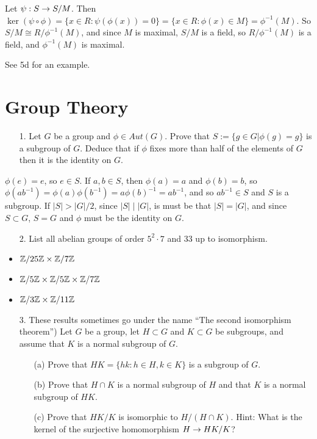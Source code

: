 \documentclass{hmwk}
\begin{document}
\pre Let $\psi: S \rightarrow S/M$. Then $\ker(\psi\circ\phi) = \{x \in R : \psi(\phi(x)) = 0\} = \{x \in R : \phi(x) \in M\} = \phi^{-1}(M)$. So $S/M \cong R/\phi^{-1}(M)$, and since $M$ is maximal, $S/M$ is a field, so $R/\phi^{-1}(M)$ is a field, and $\phi^{-1}(M)$ is maximal. 

\pre See 5d for an example. 

\section{Group Theory}

\begin{itemize}
    \item[1.] Let $G$ be a group and $\phi \in Aut(G)$. Prove that $S := \{g \in G | \phi(g) = g\}$ is a subgroup of $G$. Deduce that if $\phi$ fixes more than half of the elements of $G$ then it is the identity on $G$.
\end{itemize}

\pre $\phi(e) = e$, so $e \in S$. If $a, b \in S$, then $\phi(a) = a$ and $\phi(b) = b$, so $\phi(ab^{-1}) = \phi(a)\phi(b^{-1}) = a\phi(b)^{-1} = ab^{-1}$, and so $ab^{-1} \in S$ and $S$ is a subgroup. If $|S| > |G|/2$, since $|S| \mid |G|$, is must be that $|S| = |G|$, and since $S \subset G$, $S = G$ and $\phi$ must be the identity on $G$. 

\begin{itemize}
    \item[2.] List all abelian groups of order $5^2 \cdot 7$ and $33$ up to isomorphism. 
\end{itemize}

\begin{itemize}
    \item $\mathbb{Z}/25\mathbb{Z} \times \mathbb{Z}/7\mathbb{Z}$
    \item $\mathbb{Z}/5\mathbb{Z} \times \mathbb{Z}/5\mathbb{Z} \times \mathbb{Z}/7\mathbb{Z}$
    \item $\mathbb{Z}/3\mathbb{Z} \times \mathbb{Z}/11\mathbb{Z}$
\end{itemize}

\begin{itemize}
    \item[3.] These results sometimes go under the name “The second isomorphism theorem”) Let $G$ be a group, let $H \subset G$ and $K \subset G$ be subgroups, and assume that $K$ is a normal subgroup of $G$.
    \begin{itemize}
        \item[(a)] Prove that $HK = \{hk : h \in H, k \in K\}$ is a subgroup of $G$.
        \item[(b)] Prove that $H \cap K$ is a normal subgroup of $H$ and that $K$ is a normal subgroup of $HK$.
        \item[(c)] Prove that $HK/K$ is isomorphic to $H/(H \cap K)$. Hint: What is the kernel of the surjective homomorphism $H \rightarrow HK/K$?
    \end{itemize}
\end{itemize}
\end{document}
